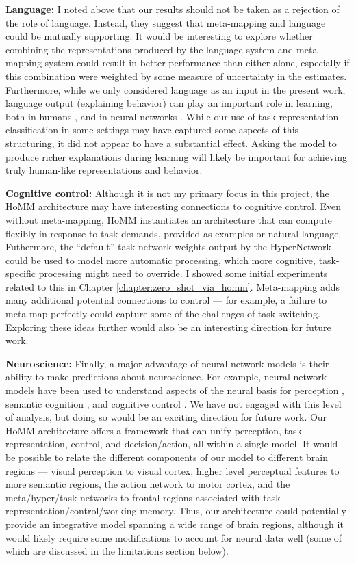 \textbf{Language:} I noted above that our results should not be taken as a rejection of the role of language. Instead, they suggest that meta-mapping and language could be mutually supporting. It would be interesting to explore whether combining the representations produced by the language system and meta-mapping system could result in better performance than either alone, especially if this combination were weighted by some measure of uncertainty in the estimates. Furthermore, while we only considered language as an input in the present work, language output (explaining behavior) can play an important role in learning, both in humans \citep{Chi1994}, and in neural networks \citep{Mu2019}. While our use of task-representation-classification in some settings may have captured some aspects of this structuring, it did not appear to have a substantial effect. Asking the model to produce richer explanations during learning will likely be important for achieving truly human-like representations and behavior. 

\textbf{Cognitive control:} Although it is not my primary focus in this project, the HoMM architecture may have interesting connections to cognitive control. Even without meta-mapping, HoMM instantiates an architecture that can compute flexibly in response to task demands, provided as examples or natural language. Futhermore, the ``default'' task-network weights output by the HyperNetwork could be used to model more automatic processing, which more cognitive, task-specific processing might need to override. I showed some initial experiments related to this in Chapter \ref{chapter:zero_shot_via_homm}. Meta-mapping adds many additional potential connections to control --- for example, a failure to meta-map perfectly could capture some of the challenges of task-switching. Exploring these ideas further would also be an interesting direction for future work. \par

\textbf{Neuroscience:} Finally, a major advantage of neural network models is their ability to make predictions about neuroscience. For example, neural network models have been used to understand aspects of the neural basis for perception \citep{Yamins2016a}, semantic cognition \citep{Rogers2004}, and cognitive control \citep{Shenhav2013}. We have not engaged with this level of analysis, but doing so would be an exciting direction for future work. Our HoMM architecture offers a framework that can unify perception, task representation, control, and decision/action, all within a single model. It would be possible to relate the different components of our model to different brain regions --- visual perception to visual cortex, higher level perceptual features to more semantic regions, the action network to motor cortex, and the meta/hyper/task networks to frontal regions associated with task representation/control/working memory. Thus, our architecture could potentially provide an integrative model spanning a wide range of brain regions, although it would likely require some modifications to account for neural data well (some of which are discussed in the limitations section below). \par 

